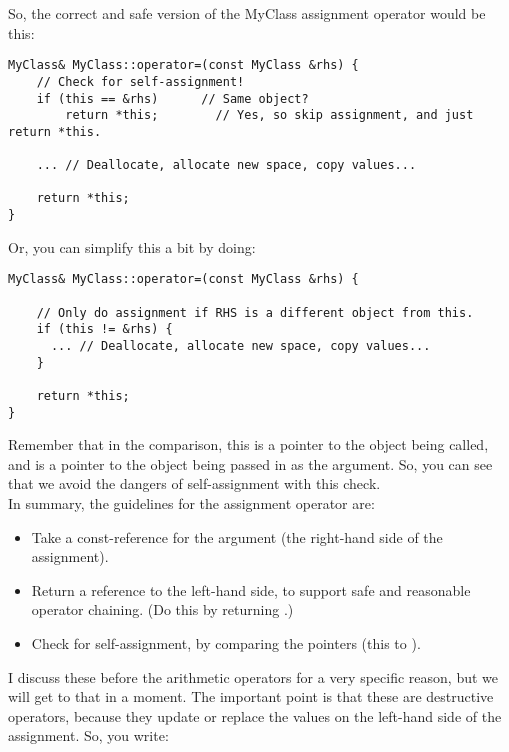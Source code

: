 So, the correct and safe version of the MyClass assignment operator would be this:

\begin{verbatim}
MyClass& MyClass::operator=(const MyClass &rhs) {
    // Check for self-assignment!
    if (this == &rhs)      // Same object?
        return *this;        // Yes, so skip assignment, and just return *this.
    
    ... // Deallocate, allocate new space, copy values...
    
    return *this;
}
\end{verbatim}

Or, you can simplify this a bit by doing:

\begin{verbatim}
MyClass& MyClass::operator=(const MyClass &rhs) {
    
    // Only do assignment if RHS is a different object from this.
    if (this != &rhs) {
      ... // Deallocate, allocate new space, copy values...
    }
    
    return *this;
}
\end{verbatim}

Remember that in the comparison, this is a pointer to the object being called, and  is a pointer to the object being passed in as the argument. So, you can see that we avoid the dangers of self-assignment with this check.\\
In summary, the guidelines for the assignment operator are:

\begin{itemize}
\tightlist
    \item Take a const-reference for the argument (the right-hand side of the assignment).
    \item Return a reference to the left-hand side, to support safe and reasonable operator chaining. (Do this by returning .)
    \item Check for self-assignment, by comparing the pointers (this to ).
\end{itemize}




I discuss these before the arithmetic operators for a very specific reason, but we will get to that in a moment. The important point is that these are destructive operators, because they update or replace the values on the left-hand side of the assignment. So, you write:

